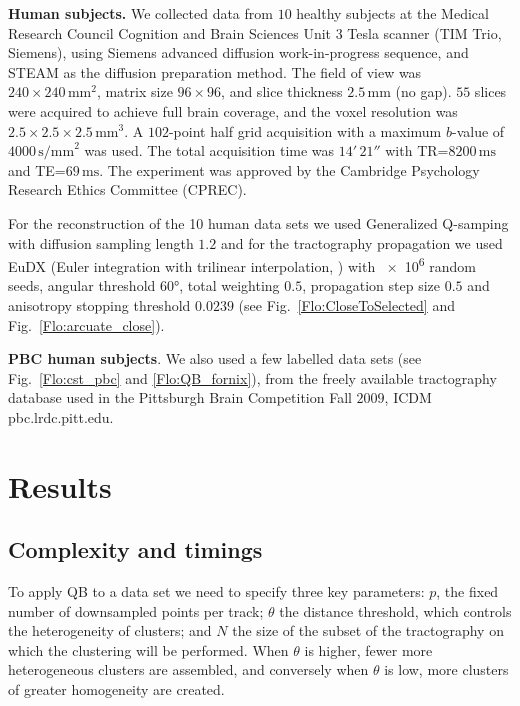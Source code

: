 \documentclass[journal]{IEEEtran}
\begin{document}
\textbf{Human subjects.} We collected data from $10$ healthy subjects at
the Medical Research Council Cognition and Brain Sciences Unit 3 Tesla scanner
(TIM Trio, Siemens), using Siemens advanced diffusion work-in-progress sequence,
and STEAM \cite{merboldt1992diffusion,MAB04} as the diffusion preparation
method. The field of view was $240\times240\,\textrm{mm}^{2}$, matrix size
$96\times96$, and slice thickness $2.5\,\textrm{mm}$ (no gap).  $55$ slices were
acquired to achieve full brain coverage, and the voxel resolution was
$2.5\times2.5\times2.5\,\textrm{mm}^{3}$. A $102$-point half grid acquisition
\cite{Yeh2010} with a maximum $b$-value of $4000\, \textrm{s/mm}^{2}$ was used.
The total acquisition time was $14'\,21''$ with TR=$8200\,\textrm{ms}$ and
TE=$69\,\textrm{ms}$. The experiment was approved by the Cambridge Psychology
Research Ethics Committee (CPREC).

For the reconstruction of the 10 human data sets we used Generalized
Q-samping \cite{Yeh2010} with diffusion sampling length $1.2$ and for
the tractography propagation we used EuDX (Euler integration with
trilinear interpolation, \cite{Garyfallidis_thesis}) with \num{e6}
random seeds, angular threshold \ang{60}, total weighting $0.5$,
propagation step size $0.5$ and anisotropy stopping threshold $0.0239$
(see Fig.~\ref{Flo:CloseToSelected} and Fig.~\ref{Flo:arcuate_close}).

\textbf{PBC human subjects}. We also used a few labelled data sets (see
Fig.~\ref{Flo:cst_pbc} and \ref{Flo:QB_fornix}), from the freely available
tractography database used in the Pittsburgh Brain Competition Fall
$2009$, ICDM pbc.lrdc.pitt.edu.

\section{Results}

\subsection{Complexity and timings\label{sub:Complexity}}

To apply QB to a data set we need to specify three key parameters:
$p$, the fixed number of downsampled points per track; $\theta$
the distance threshold, which controls the heterogeneity of clusters;
and $N$ the size of the subset of the tractography on which the clustering
will be performed. When $\theta$ is higher, fewer more heterogeneous
clusters are assembled, and conversely when $\theta$ is low, more
clusters of greater homogeneity are created.
\end{document}
